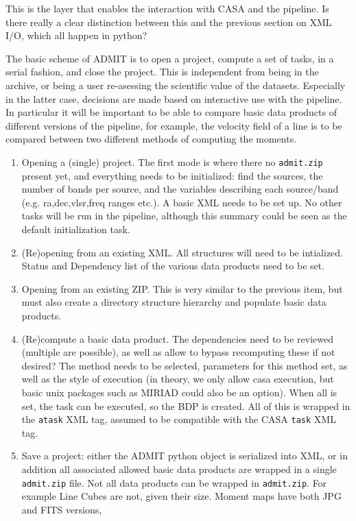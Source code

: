 \documentclass{article}
\begin{document}
This is the layer that enables the interaction with
CASA and the pipeline. Is there really a clear distinction 
between this and the previous section on XML I/O, which
all happen in python?

The basic scheme of ADMIT is to open a project, compute a set of
tasks, in a serial fashion, and close the project. This is independent
from being in the archive, or being a user re-asessing the scientific
value of the datasets. Especially in the latter case, decisions are
made based on interactive use with the pipeline. In particular it will
be important to be able to compare basic data products of different
versions of the pipeline, for example, the velocity field of a line is
to be compared between two different methods of computing the moments.

\begin{enumerate}

\item
Opening a (single) project. The first mode is where there no {\tt admit.zip} 
present yet, and everything needs to be initialized: find
the sources, the number of bands per source, and the variables
describing each source/band (e.g. ra,dec,vlsr,freq ranges etc.). A
basic XML needs to be set up.  No other tasks will be run in the
pipeline, although this summary could be seen as the default
initialization task.


\item
(Re)opening from an existing XML.  All structures will need to be 
intialized. Status and Dependency list of the various data products
need to be set.

\item
Opening from an existing ZIP. This is very similar to the previous
item, but must also create a directory structure hierarchy and 
populate basic data products.

\item
(Re)compute a basic data product. The dependencies need to be reviewed
(multiple are possible), as well as allow to bypass recomputing these
if not desired?  The method needs to be selected, parameters for this
method set, as well as the style of execution (in theory, we only
allow casa execution, but basic unix packages such as MIRIAD could 
also be an option).  When all is set, the task can be executed, so the
BDP is created. All of this is wrapped in the {\tt atask} XML tag,
assumed to be compatible with the CASA {\tt task} XML tag.

\item
Save a project:  either the ADMIT python object is serialized into XML, 
or in addition all associated allowed basic data products 
are wrapped in a single {\tt admit.zip} file. Not all data products
can be wrapped in {\tt admit.zip}. For example Line Cubes are not, given
their size. Moment maps have both JPG and FITS versions, 


\end{enumerate}
\end{document}
